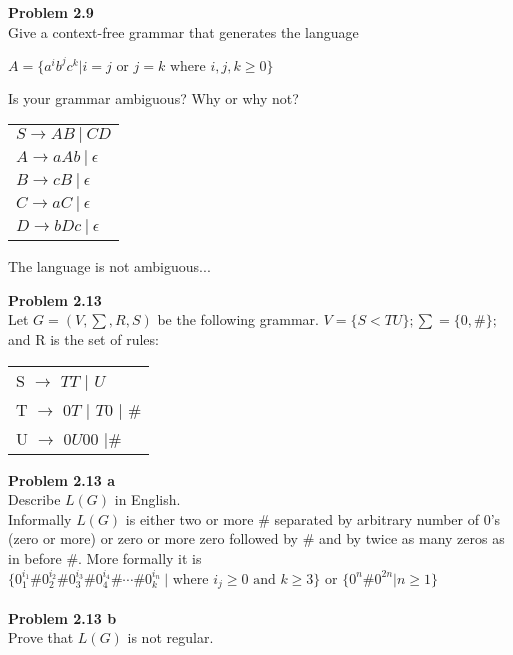 \documentclass{article}
\newcommand{\problem}[1]{\large{\textbf{Problem #1} \\}}
\begin{document}
\problem{2.9}
Give a context-free grammar that generates the language
\begin{center}
$A = \{a^i b^j c^k | i = j \text{ or } j = k \text{ where } i,j,k \geq 0\}$
\end{center}
Is your grammar ambiguous? Why or why not?

\begin{table}[h!]
\centering
\begin{tabular}{l}
$S \rightarrow A B\: | \: C D $\\
$A \rightarrow aAb \: | \: \epsilon $\\
$B \rightarrow cB \: | \: \epsilon $\\
$C \rightarrow aC \: | \: \epsilon $\\
$D \rightarrow bDc \:| \: \epsilon $\\
\end{tabular}
\end{table}

The language is not ambiguous... \\

\pagebreak

\problem{2.13}
Let $G = (V, \sum, R, S)$ be the following grammar. $V = \{S<T U\}; \sum = \{0,\#\};$ and R is the set of rules:
\begin{table}[h!]
\centering
\begin{tabular}{l}
S $\rightarrow$ $TT$ $|$ $U$ \\
T $\rightarrow$ $0T$ $|$ $T0$ $|$ $\#$   \\
U $\rightarrow$  $0U00$ $|\#$
\end{tabular}
\end{table}

\vspace{0.2cm}

\problem{2.13 a}
Describe $L(G)$ in English. \\

Informally $L(G)$ is either two or more $\#$ separated by arbitrary number of 0's (zero or more)
or zero or more zero followed by $\#$ and by twice as many zeros as in before $\#$. 
More formally it is $\{0^{i_1}_1\#0^{i_2}_2\#0^{i_3}_3\#0^{i_4}_4\#\cdots\#0^{i_n}_k\ |
\text{ where } i_j \geq 0 \text{ and } k \geq 3 \}$ or $\{0^n \# 0^{2n} | n \geq 1\}$ \\ \\
\problem{2.13 b}
Prove that $L(G)$ is not regular. \\ \\
\end{document}
